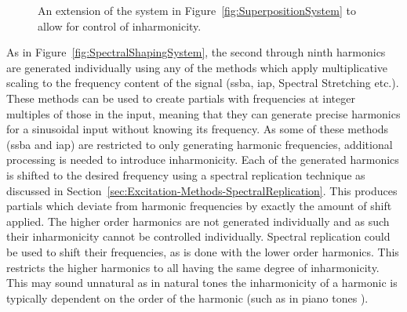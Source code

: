 \begin{figure}[h!]
			\caption{An extension of the system in Figure~\ref{fig:SuperpositionSystem} to allow for control
			         of inharmonicity.}
			\label{fig:InharmonicitySystem}
		\end{figure}

		As in Figure~\ref{fig:SpectralShapingSystem}, the second through ninth harmonics are generated individually
		using any of the methods which apply multiplicative scaling to the frequency content of the signal
		(\acrshort{ssba}, \acrshort{iap}, Spectral Stretching etc.). These methods can be used to create partials
		with frequencies at integer multiples of those in the input, meaning that they can generate precise
		harmonics for a sinusoidal input without knowing its frequency. As some of these methods (\acrshort{ssba}
		and \acrshort{iap}) are restricted to only generating harmonic frequencies, additional processing is needed
		to introduce inharmonicity. Each of the generated harmonics is shifted to the desired frequency using a
		spectral replication technique as discussed in Section~\ref{sec:Excitation-Methods-SpectralReplication}.
		This produces partials which deviate from harmonic frequencies by exactly the amount of shift applied. The
		higher order harmonics are not generated individually and as such their inharmonicity cannot be controlled
		individually. Spectral replication could be used to shift their frequencies, as is done with the lower
		order harmonics. This restricts the higher harmonics to all having the same degree of inharmonicity.  This
		may sound unnatural as in natural tones the inharmonicity of a harmonic is typically dependent on the order
		of the harmonic (such as in piano tones \citep{young1952inharmonicity}).

